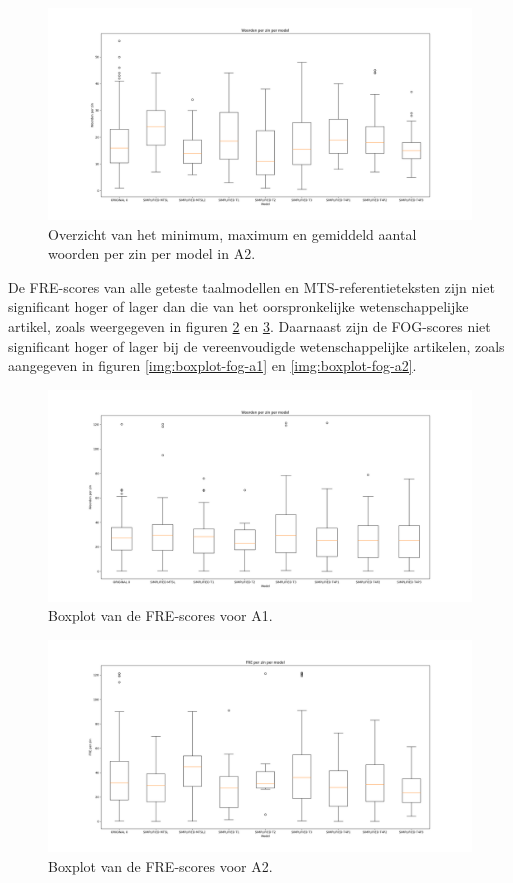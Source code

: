 \begin{figure}
	\includegraphics[width=\linewidth]{img/boxplot-avg-a2.png}
	\caption{Overzicht van het minimum, maximum en gemiddeld aantal woorden per zin per model in A2.}
	\label{img:boxplot-min-max-avg-words-a2}
\end{figure}

De FRE-scores van alle geteste taalmodellen en MTS-referentieteksten zijn niet significant hoger of lager dan die van het oorspronkelijke wetenschappelijke artikel, zoals weergegeven in figuren \ref{img:boxplot-fre-a1} en \ref{img:boxplot-fre-a2}. Daarnaast zijn de FOG-scores niet significant hoger of lager bij de vereenvoudigde wetenschappelijke artikelen, zoals aangegeven in figuren \ref{img:boxplot-fog-a1} en \ref{img:boxplot-fog-a2}. 


\begin{figure}
	\includegraphics[width=\linewidth]{img/boxplot-fre-a1.png}
	\caption{Boxplot van de FRE-scores voor A1.}
	\label{img:boxplot-fre-a1}
\end{figure}

\begin{figure}
	\includegraphics[width=\linewidth]{img/boxplot-fre-a2.png}
	\caption{Boxplot van de FRE-scores voor A2.}
	\label{img:boxplot-fre-a2}
\end{figure}

